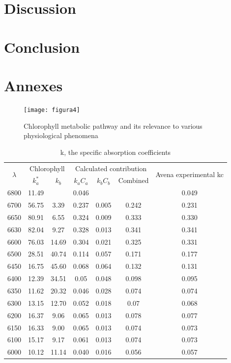 \documentclass[a4paper, 11pt]{article}
\begin{document}
	
\section{Discussion}
\section{Conclusion}
\restoregeometry



\newpage
\section{Annexes}
\begin{figure}
	\centering
	\texttt{[image: figura4]}
	\caption{Chlorophyll metabolic pathway and its relevance to various physiological phenomena \cite{Tanaka2006}} 
	\label{fig3}
\end{figure}

\begin{table}
	\begin{longtable}{|c|c|c|c|c|c|c|}
		\hline
		\multirow{2}{*}{$\lambda$} & 
		\multicolumn{2}{c}{Chlorophyll} \vline & 
		\multicolumn{3}{c}{Calculated contribution} \vline & 
		\multirow{2}{*}{Avena experimental kc} \\ \cline{2-6}
		& $k_a^*$ & $k_b$ & $k_aC_a$ & $k_bC_b$ & Combined & \\ \hline
		6800 & 11.49 & & 0.046 & & & 0.049 \\
		6700 & 56.75 & 3.39 & 0.237 & 0.005 & 0.242 & 0.231\\
		6650 & 80.91 & 6.55 & 0.324 & 0.009 & 0.333 & 0.330\\
		6630 & 82.04 & 9.27 & 0.328 & 0.013 & 0.341 & 0.341\\
		6600 & 76.03 & 14.69 & 0.304 & 0.021 & 0.325 & 0.331\\
		6500 & 28.51 & 40.74 & 0.114 & 0.057 & 0.171 &0.177\\
		6450 & 16.75 & 45.60 & 0.068 & 0.064 & 0.132 & 0.131\\
		6400 & 12.39 & 34.51 &0.05 & 0.048 & 0.098 & 0.095\\
		6350 & 11.62 & 20.32 & 0.046 & 0.028 & 0.074 & 0.074\\
		6300 & 13.15 & 12.70 & 0.052 & 0.018 & 0.07 &0.068\\
		6200 & 16.37 & 9.06 & 0.065 & 0.013 &0.078 & 0.077\\
		6150 & 16.33 &9.00 &0.065 & 0.013 & 0.074 & 0.073\\
		6100 & 15.17 & 9.17 & 0.061 & 0.013 & 0.074 & 0.073\\
		6000 & 10.12 & 11.14 & 0.040 & 0.016 & 0.056 & 0.057\\\hline
	\end{longtable}
	\caption{k, the specific absorption coefficients \cite{Mackinney}}
	\label{table1}
\end{table}
\end{document}
